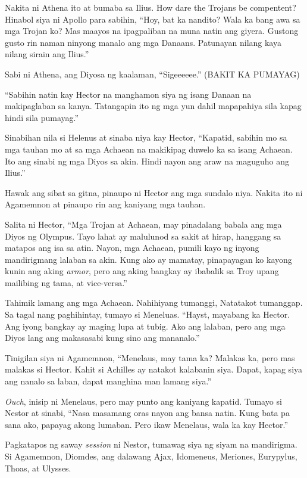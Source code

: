 \documentclass[12pt,letterpaper]{report}
\begin{document}
Nakita ni Athena ito at bumaba sa Ilius. How dare the Trojans be compentent? Hinabol siya ni Apollo para sabihin, ``Hoy, bat ka nandito? Wala ka bang awa sa mga Trojan ko? Mas maayos na ipagpaliban na muna natin ang giyera. Gustong gusto rin naman ninyong manalo ang mga Danaans. Patunayan nilang kaya nilang sirain ang Ilius.''

Sabi ni Athena, ang Diyosa ng kaalaman, ``Sigeeeeee.'' (BAKIT KA PUMAYAG)

``Sabihin natin kay Hector na manghamon siya ng isang Danaan na makipaglaban sa kanya. Tatangapin ito ng mga yun dahil mapapahiya sila kapag hindi sila pumayag.''

Sinabihan nila si Helenus at sinaba niya kay Hector, ``Kapatid, sabihin mo sa mga tauhan mo at sa mga Achaean na makikipag duwelo ka sa isang Achaean. Ito ang sinabi ng mga Diyos sa akin. Hindi nayon ang araw na maguguho ang Ilius.''

Hawak ang sibat sa gitna, pinaupo ni Hector ang mga sundalo niya. Nakita ito ni Agamemnon at pinaupo rin ang kaniyang mga tauhan.

Salita ni Hector, ``Mga Trojan at Achaean, may pinadalang babala ang mga Diyos ng Olympus. Tayo lahat ay malulunod sa sakit at hirap, hanggang sa matapos ang isa sa atin. Nayon, mga Achaean, pumili kayo ng inyong mandirigmang lalaban sa akin. Kung ako ay mamatay, pinapayagan ko kayong kunin ang aking \textit{armor}, pero ang aking bangkay ay ibabalik sa Troy upang mailibing ng tama, at vice-versa.''

Tahimik lamang ang mga Achaean. Nahihiyang tumanggi, Natatakot tumanggap. Sa tagal nang paghihintay, tumayo si Meneluas. ``Hayst, mayabang ka Hector. Ang iyong bangkay ay maging lupa at tubig. Ako ang lalaban, pero ang mga Diyos lang ang makasasabi kung sino ang mananalo.''

Tinigilan siya ni Agamemnon, ``Menelaus, may tama ka? Malakas ka, pero mas malakas si Hector. Kahit si Achilles ay natakot kalabanin siya. Dapat, kapag siya ang nanalo sa laban, dapat manghina man lamang siya.''

\textit{Ouch}, inisip ni Menelaus, pero may punto ang kaniyang kapatid. Tumayo si Nestor at sinabi, ``Nasa masamang oras nayon ang bansa natin. Kung bata pa sana ako, papayag akong lumaban. Pero ikaw Menelaus, wala ka kay Hector.''

Pagkatapos ng saway \textit{session} ni Nestor, tumawag siya ng siyam na mandirigma. Si Agamemnon, Diomdes, ang dalawang Ajax, Idomeneus, Meriones, Eurypylus, Thoas, at Ulysses.
\end{document}
